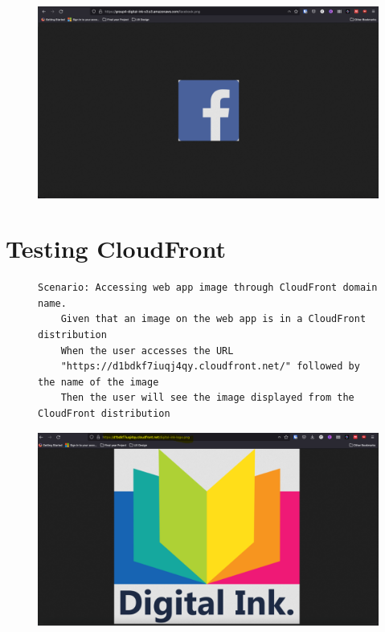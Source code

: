 \begin{figure}[!htbp]
    \centering
    \includegraphics[width=\textwidth]{resources/s3/s3-image-displayed}
    \label{fig:s3-test-photo}
\end{figure}

\clearpage

\section{Testing CloudFront}\label{sec:testing-cloudfront}

\begin{figure}[!htbp]
    \centering
    \begin{verbatim}
Scenario: Accessing web app image through CloudFront domain name.
    Given that an image on the web app is in a CloudFront distribution
    When the user accesses the URL
    "https://d1bdkf7iuqj4qy.cloudfront.net/" followed by the name of the image
    Then the user will see the image displayed from the CloudFront distribution
    \end{verbatim}
    \label{fig:accessing-image-cloudfront}
\end{figure}

\begin{figure}[!htbp]
    \centering
    \includegraphics[width=\textwidth]{resources/cloudfront/cloudfront-website}
    \label{fig:cloudfront-test-photo}
\end{figure}

